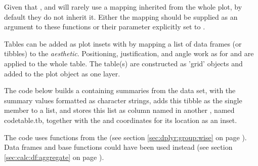 \documentclass[krantz2]{krantz}\usepackage{knitr}
\begin{document}
\begin{warningbox}
Given that  ,  and  will rarely use a mapping inherited from the whole plot, by default they do not inherit it. Either the mapping should be supplied as an argument to these functions or their parameter  explicitly set to .
\end{warningbox}

Tables can be added as plot insets with  by mapping a list of data frames (or tibbles) to the  \emph{aesthetic}. Positioning, justification, and angle work as for  and are applied to the whole table. The table(s) are constructed as 'grid'  objects and added to the  plot object as one layer.

The code below builds a  containing summaries from the  data set, with the summary values formatted as character strings, adds this tibble as the single member to a list, and stores this list as column named  in another , named code{table.tb}, together with the  and  coordinates for its location as an inset.

\begin{explainbox}
The code uses functions from the  (see section \ref{sec:dplyr:group:wise} on page \pageref{sec:dplyr:group:wise}). Data frames and base \Rlang functions could have been used instead (see section \ref{sec:calc:df:aggregate} on page \pageref{sec:calc:df:aggregate}).
\end{explainbox}

\begin{knitrout}\footnotesize
{}\color{fgcolor}\begin{kframe}
\begin{alltt}
  \hlstd{(} \hlstd{=} \hlstd{(}  \hlstd{=} \hlstd{),}
             \hlstd{=} \hlstd{(}  \hlstd{=} \hlstd{),}
             \hlstd{=} \hlstd{(}  \hlstd{=} \hlstd{))} \hlkwb{->} 
 \hlkwb{<-} \hlstd{(} \hlstd{=} \hlstd{,}  \hlstd{=} \hlstd{,}  \hlstd{=} 
\end{alltt}
\end{kframe}
\end{knitrout}
\end{document}
